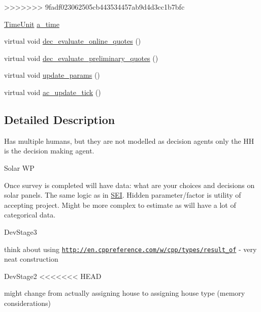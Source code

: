 >>>>>>> 9fadf023062505cb443534457ab9d4d3cc1b7bfc
\begin{DoxyCompactItemize}
\item 
\hyperlink{namespacesolar__core_a4b5949d07259da6f8a20d12a30403e90}{Time\+Unit} \hyperlink{classsolar__core_1_1_household_ad323100235079f34537ccda656e86e64}{a\+\_\+time}
\item 
virtual void \hyperlink{classsolar__core_1_1_household_a2d8c80f6db68610fb3e0f9b48e1e490b}{dec\+\_\+evaluate\+\_\+online\+\_\+quotes} ()
\item 
virtual void \hyperlink{classsolar__core_1_1_household_a6e27e36f623bd307eedcd97c550d5c5e}{dec\+\_\+evaluate\+\_\+preliminary\+\_\+quotes} ()
\item 
virtual void \hyperlink{classsolar__core_1_1_household_a733a90456d57f698b3aa974c6c6e0108}{update\+\_\+params} ()
\item 
virtual void \hyperlink{classsolar__core_1_1_household_ac73de13d0d4b4e01b2defbb85872c4b2}{ac\+\_\+update\+\_\+tick} ()
\end{DoxyCompactItemize}


\subsection{Detailed Description}
Has multiple humans, but they are not modelled as decision agents only the H\+H is the decision making agent.

\begin{DoxyRefDesc}{Solar W\+P}
\item[\hyperlink{wp__wp000001}{Solar W\+P}]Once survey is completed will have data\+: what are your choices and decisions on solar panels. The same logic as in \hyperlink{classsolar__core_1_1_s_e_i}{S\+E\+I}. Hidden parameter/factor is utility of accepting project. Might be more complex to estimate as will have a lot of categorical data.\end{DoxyRefDesc}


\begin{DoxyRefDesc}{Dev\+Stage3}
\item[\hyperlink{_dev_stage3__DevStage3000002}{Dev\+Stage3}]think about using \href{http://en.cppreference.com/w/cpp/types/result_of}{\tt http\+://en.\+cppreference.\+com/w/cpp/types/result\+\_\+of} -\/ very neat construction\end{DoxyRefDesc}


\begin{DoxyRefDesc}{Dev\+Stage2}
<<<<<<< HEAD
\item[\hyperlink{_dev_stage2__DevStage2000008}{Dev\+Stage2}]might change from actually assigning house to assigning house type (memory considerations)\end{DoxyRefDesc}


